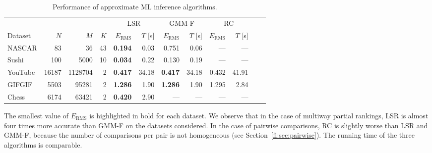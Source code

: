 \begin{table}[ht]
  \caption{Performance of approximate ML inference algorithms.}
  \label{fi:tab:approxalg}
  \centering
  \small{
  \begin{tabular}{l rrr rr rr rr rr}
    \toprule
            &             &               &          & \multicolumn{2}{c}{LSR}            & \multicolumn{2}{c}{GMM-F}          & \multicolumn{2}{c}{RC} \\
                                                       \cmidrule(l){5-6}                    \cmidrule(l){7-8}                    \cmidrule(l){9-10}
    Dataset &         $N$ &           $M$ &      $K$ &     $E_{\text{RMS}}$ &     $T$ [s] &     $E_{\text{RMS}}$ &     $T$ [s] & $E_{\text{RMS}}$ & $T$ [s] \\
    \midrule
    NASCAR  &    \num{83} &      \num{36} & \num{43} & \bfseries\num{0.194} &  \num{0.03} &          \num{0.751} &  \num{0.06} &         --- &         --- \\
    Sushi   &   \num{100} &    \num{5000} & \num{10} & \bfseries\num{0.034} &  \num{0.22} &          \num{0.130} &  \num{0.19} &         --- &         --- \\
    \addlinespace                                                                                                             
    YouTube & \num{16187} & \num{1128704} &  \num{2} & \bfseries\num{0.417} & \num{34.18} & \bfseries\num{0.417} & \num{34.18} & \num{0.432} & \num{41.91} \\
    GIFGIF  &  \num{5503} &   \num{95281} &  \num{2} & \bfseries\num{1.286} &  \num{1.90} & \bfseries\num{1.286} &  \num{1.90} & \num{1.295} &  \num{2.84} \\
    \addlinespace                                                                                                             
    Chess   &  \num{6174} &   \num{63421} &  \num{2} & \bfseries\num{0.420} &  \num{2.90} &                  --- &         --- &         --- &         --- \\
    \bottomrule
  \end{tabular}
  }
\end{table}

The smallest value of $E_{\text{RMS}}$ is highlighted in bold for each dataset.
We observe that in the case of multiway partial rankings, LSR is almost four times more accurate than GMM-F on the datasets considered.
In the case of pairwise comparisons, RC is slightly worse than LSR and GMM-F, because the number of comparisons per pair is not homogeneous (see Section~\ref{fi:sec:pairwise}).
The running time of the three algorithms is comparable.

